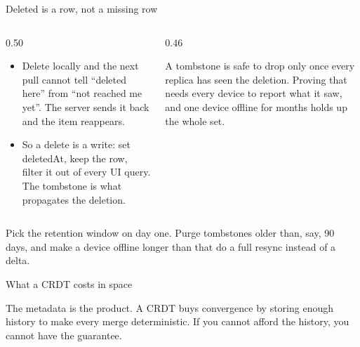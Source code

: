 \documentclass[10pt,aspectratio=169,t]{beamer}
\begin{document}
\begin{frame}[eyebrow=Costs]{Deleted is a row, not a missing row}
  \vskip 3mm
  \begin{columns}[T]
    \begin{column}{0.50\textwidth}
      \begin{itemize}
        \item Delete locally and the next pull cannot tell ``deleted here'' from ``not reached me yet''. The server sends it back and the item reappears.
        \item So a delete is a write: set deletedAt, keep the row, filter it out of every UI query. The tombstone is what propagates the deletion.
      \end{itemize}
    \end{column}
    \begin{column}{0.46\textwidth}
      \begin{warning}
        A tombstone is safe to drop only once every replica has seen the deletion. Proving that needs every device to report what it saw, and one device offline for months holds up the whole set.
      \end{warning}
    \end{column}
  \end{columns}
  \begin{takeaway}{Pick the retention window on day one.}
    Purge tombstones older than, say, 90 days, and make a device offline longer than that do a full resync instead of a delta.
  \end{takeaway}
\end{frame}

\begin{frame}[eyebrow=Costs]{What a CRDT costs in space}
  \vskip 3mm
  \begin{grid}[3]
  \end{grid}
  \vskip 4mm
  \begin{takeaway}{The metadata is the product.}
    A CRDT buys convergence by storing enough history to make every merge deterministic. If you cannot afford the history, you cannot have the guarantee.
  \end{takeaway}
\end{frame}
\end{document}
